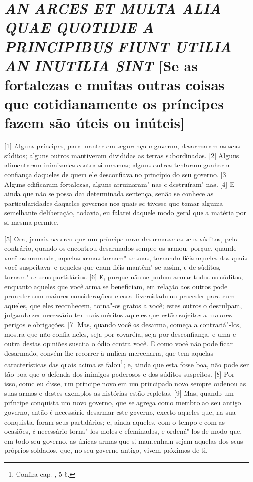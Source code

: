\quebra\section{\emph{AN ARCES ET MULTA ALIA QUAE QUOTIDIE A PRINCIPIBUS FIUNT UTILIA AN
INUTILIA SINT}
{[}Se as fortalezas e muitas outras coisas que cotidianamente os
príncipes fazem são úteis ou inúteis{]}}

{[}1{]} Alguns príncipes, para manter em segurança o governo, desarmaram
os seus súditos; alguns outros mantiveram divididas as terras
subordinadas. {[}2{]} Alguns alimentaram inimizades contra si mesmos;
alguns outros tentaram ganhar a confiança daqueles de quem ele
desconfiava no princípio do seu governo. {[}3{]} Alguns edificaram
fortalezas, alguns arruinaram"-nas e destruíram"-nas. {[}4{]} E ainda que
não se possa dar determinada sentença, senão se conhece as
particularidades daqueles governos nos quais se tivesse que tomar alguma
semelhante deliberação, todavia, eu falarei daquele modo geral que a
matéria por si mesma permite.

{[}5{]} Ora, jamais ocorreu que um príncipe novo desarmasse os seus
súditos, pelo contrário, quando os encontrou desarmados sempre os armou,
porque, quando você os armanda, aquelas armas tornam"-se suas, tornando
fiéis aqueles dos quais você suspeitava, e aqueles que eram fiéis
mantêm"-se assim, e de súditos, tornam"-se seus partidários. {[}6{]} E,
porque não se podem armar todos os súditos, enquanto aqueles que você
arma se beneficiam, em relação aos outros pode proceder sem maiores
considerações: e essa diversidade no proceder para com aqueles, que eles
reconhecem, torna"-os gratos a você; estes outros o desculpam, julgando
ser necessário ter mais méritos aqueles que estão sujeitos a maiores
perigos e obrigações. {[}7{]} Mas, quando você os desarma, começa a
contrariá"-los, mostra que não confia neles, seja por covardia, seja por
desconfiança, e uma e outra destas opiniões suscita o ódio contra você.
E como você não pode ficar desarmado, convém lhe recorrer à milícia
mercenária, que tem aquelas características das quais acima se
falou\footnote{Confira cap. , 5-6.}; e, ainda que esta fosse boa,
não pode ser tão boa que o defenda dos inimigos poderosos e dos súditos
suspeitos. {[}8{]} Por isso, como eu disse, um príncipe novo em um
principado novo sempre ordenou as suas armas e destes exemplos as
histórias estão repletas. {[}9{]} Mas, quando um príncipe conquista um
novo governo, que se agrega como membro ao seu antigo governo, então é
necessário desarmar este governo, exceto aqueles que, na sua conquista,
foram seus partidários; e, ainda aqueles, com o tempo e com as ocasiões,
é necessário torná"-los moles e efeminados, e ordená"-los de modo que, em
todo seu governo, as únicas armas que si mantenham sejam aquelas dos
seus próprios soldados, que, no seu governo antigo, vivem próximos de
ti.

